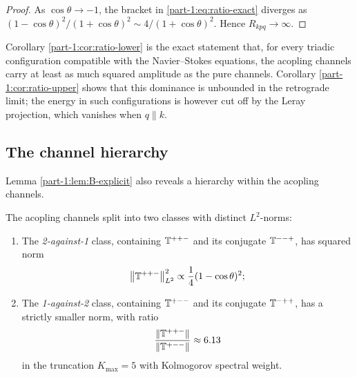 \begin{proof}
As $\cos\theta \to -1$, the bracket in \eqref{part-1:eq:ratio-exact} diverges 
as $(1-\cos\theta)^2/(1+\cos\theta)^2 \sim 4/(1+\cos\theta)^2$. Hence 
$R_{kpq}\to\infty$.
\end{proof}

\begin{remark}\label{part-1:rem:ratio-meaning}
Corollary \ref{part-1:cor:ratio-lower} is the exact statement that, for every 
triadic configuration compatible with the Navier--Stokes equations, the 
acopling channels carry at least as much squared amplitude as the pure 
channels. Corollary \ref{part-1:cor:ratio-upper} shows that this dominance is 
unbounded in the retrograde limit; the energy in such configurations 
is however cut off by the Leray projection, which vanishes when 
$q\parallel k$.
\end{remark}

\subsection{The channel hierarchy}
\label{part-1:ssec:hierarchy}

Lemma \ref{part-1:lem:B-explicit} also reveals a hierarchy within the 
acopling channels.

\begin{proposition}[Hierarchy]\label{part-1:prop:hierarchy}
The acopling channels split into two classes with distinct 
$L^2$-norms:
\begin{enumerate}[label=(\roman*),leftmargin=*]
\item The \emph{2-against-1} class, containing $\mathbb{T}^{++-}$ and its 
      conjugate $\mathbb{T}^{--+}$, has squared norm
      \begin{equation}\label{part-1:eq:hierarchy-1}
      \left\lVert \mathbb{T}^{++-} \right\rVert_{L^2}^2 \propto \frac{1}{4}(1-\cos\theta)^2;
      \end{equation}
\item The \emph{1-against-2} class, containing $\mathbb{T}^{+--}$ and its 
      conjugate $\mathbb{T}^{-++}$, has a strictly smaller norm, with ratio 
      \begin{equation}\label{part-1:eq:hierarchy-2}
      \frac{\left\lVert \mathbb{T}^{++-} \right\rVert}{\left\lVert \mathbb{T}^{+--} \right\rVert} \approx 6.13
      \end{equation}
      in the truncation $K_{\max} = 5$ with Kolmogorov spectral weight.
\end{enumerate}
\end{proposition}

